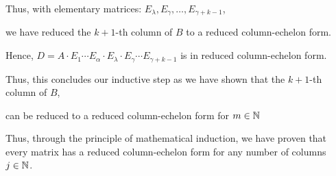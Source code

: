 \documentclass{report}
\begin{document}
{{{			Thus, with elementary matrices: \(E_{\lambda}, E_{\gamma}, \ldots, E_{\gamma + k - 1}\),

			we have reduced the \(k + 1\)-th column of \(B\) to a reduced column-echelon form.

			Hence, \(D = A \cdot E_1 \cdots E_{\alpha} \cdot E_{\lambda} \cdot E_{\gamma} \cdots E_{\gamma + k - 1}\) is in reduced column-echelon form.
		}

		Thus, this concludes our inductive step as we have shown that the \(k + 1\)-th column of \(B\),

		can be reduced to a reduced column-echelon form for \(m \in \NN\)
	}

	\parinf
	Thus, through the principle of mathematical induction, we have proven that every matrix has a reduced column-echelon form for any number of columns \(j \in \NN\).

}
\end{document}
